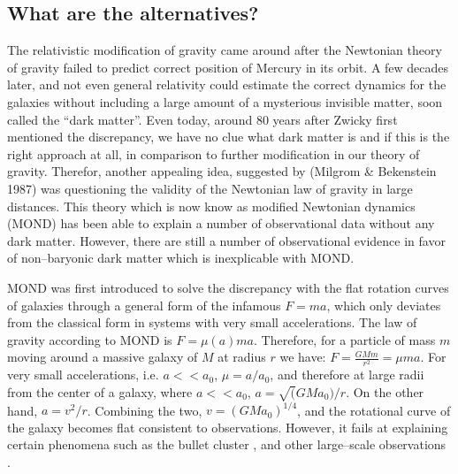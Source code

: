\documentclass[paper=a4, fontsize=11pt]{scrartcl} %
\numberwithin{equation}{section} %
\numberwithin{figure}{section} %
\numberwithin{table}{section} %
\begin{document}

\subsection{What are the alternatives?}

The relativistic modification of gravity came around after the Newtonian theory of gravity failed to predict correct position of Mercury in its orbit. A few decades later, and not even general relativity could estimate the correct dynamics for the galaxies without including a large amount of a mysterious invisible matter, soon called the ``dark matter''. Even today, around 80 years after Zwicky first mentioned the discrepancy, we have no clue what dark matter is and if this is the right approach at all, in comparison to further modification in our theory of gravity. 
Therefor, another appealing idea, suggested by (Milgrom \& Bekenstein 1987) was questioning the validity of the Newtonian law of gravity in large distances. This theory which is now know as modified Newtonian dynamics (MOND) has been able to explain a number of observational data without any dark matter. However, there are still a number of observational evidence in favor of non--baryonic dark matter which is inexplicable with MOND. 


MOND was first introduced to solve the discrepancy with the flat rotation curves of galaxies through a general form of the infamous $F = ma$, which only deviates from the classical form in systems with very small accelerations. The law of gravity according to MOND is $F=\mu(a)ma$. Therefore, for a particle of mass $m$ moving around a massive galaxy of $M$ at radius $r$ we have: $F = \frac{GMm}{r^2} = \mu m a$. For very small accelerations, i.e. $a<<a_0$, $\mu = a/a_0$, and therefore at large radii from the center of a galaxy, where $a<<a_0$, $a=\sqrt(GMa_0)/r$. On the other hand, $a = v^2/r$. Combining the two, $v = (GMa_0)^\mathrm{1/4}$, and the rotational curve of the galaxy becomes flat consistent to observations. However, it fails at explaining certain phenomena such as the bullet cluster \citep[17][]{Clowe+2006}, and other large--scale observations \citep[16][]{Famaey+2012}.


\newpage
\end{document}
